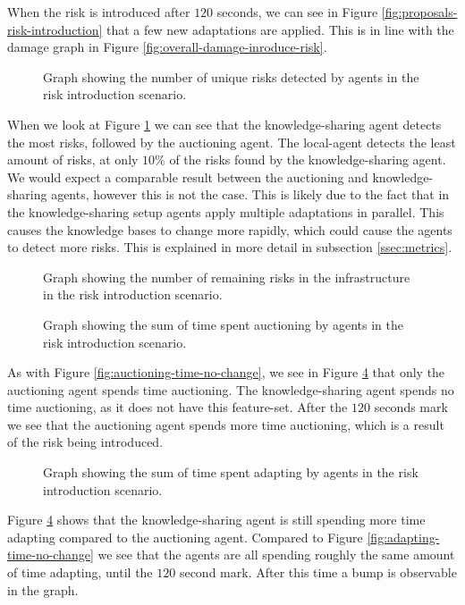 When the risk is introduced after $120$ seconds, we can see in Figure \ref{fig:proposals-risk-introduction} that a few new adaptations are applied. This is in line with the damage graph in Figure \ref{fig:overall-damage-inroduce-risk}.

\begin{figure}[H]
    \centering
        
    \caption{Graph showing the number of unique risks detected by agents in the risk introduction scenario.}
    \label{fig:risk-count-risk-introduction}
\end{figure}

When we look at Figure \ref{fig:risk-count-risk-introduction} we can see that the knowledge-sharing agent detects the most risks, followed by the auctioning agent. The local-agent detects the least amount of risks, at only $10\%$ of the risks found by the knowledge-sharing agent. We would expect a comparable result between the auctioning and knowledge-sharing agents, however this is not the case. This is likely due to the fact that in the knowledge-sharing setup agents apply multiple adaptations in parallel. This causes the knowledge bases to change more rapidly, which could cause the agents to detect more risks. This is explained in more detail in subsection \ref{ssec:metrics}.

\begin{figure}[H]
    \centering
        
    \caption{Graph showing the number of remaining risks in the infrastructure in the risk introduction scenario.}
    \label{fig:risk-remaining-risk-introduction}
\end{figure}


\begin{figure}[H]
    \centering
        
    \caption{Graph showing the sum of time spent auctioning by agents in the risk introduction scenario.}
    \label{fig:auctioning-time-risk-introduction}
\end{figure}

As with Figure \ref{fig:auctioning-time-no-change}, we see in Figure \ref{fig:adapting-time-risk-introduction} that only the auctioning agent spends time auctioning. The knowledge-sharing agent spends no time auctioning, as it does not have this feature-set. After the $120$ seconds mark we see that the auctioning agent spends more time auctioning, which is a result of the risk being introduced.

\begin{figure}[H]
    \centering
        
    \caption{Graph showing the sum of time spent adapting by agents in the risk introduction scenario.}
    \label{fig:adapting-time-risk-introduction}
\end{figure}

Figure \ref{fig:adapting-time-risk-introduction} shows that the knowledge-sharing agent is still spending more time adapting compared to the auctioning agent. Compared to Figure \ref{fig:adapting-time-no-change} we see that the agents are all spending roughly the same amount of time adapting, until the $120$ second mark. After this time a bump is observable in the graph.
